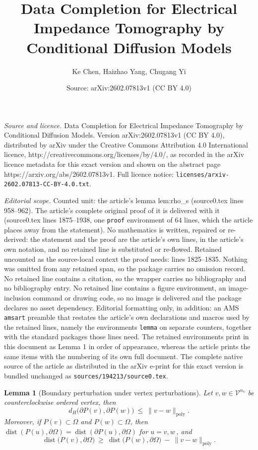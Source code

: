 \documentclass[10pt,a4paper]{amsart}
\title{Data Completion for Electrical Impedance Tomography by Conditional Diffusion Models}
\author{Ke Chen, Haizhao Yang, Chugang Yi}
\date{Source: arXiv:2602.07813v1 (CC BY 4.0)}
\newtheorem{lemma}{Lemma}
\newcommand{\dist}{\operatorname{dist}}
\begin{document}
\maketitle

\noindent\emph{Source and licence.} Data Completion for Electrical Impedance Tomography by Conditional Diffusion Models. Version arXiv:2602.07813v1 (CC BY 4.0), distributed by arXiv under the Creative Commons Attribution 4.0 International licence, http://creativecommons.org/licenses/by/4.0/, as recorded in the arXiv licence metadata for this exact version and shown on the abstract page https://arxiv.org/abs/2602.07813v1. Full licence notice: \texttt{licenses/arxiv-2602.07813-CC-BY-4.0.txt}.\par\smallskip

\noindent\textit{Editorial scope.} Counted unit: the article's lemma lem:rho\_s (source0.tex lines 958--962). The article's complete original proof of it is delivered with it (source0.tex lines 1875--1938, one \texttt{proof} environment of 64 lines, which the article places away from the statement). No mathematics is written, repaired or re-derived: the statement and the proof are the article's own lines, in the article's own notation, and no retained line is substituted or re-flowed.  Retained uncounted as the source-local context the proof needs: lines 1825--1835.  Nothing was omitted from any retained span, so the package carries no omission record.  No retained line contains a citation, so the wrapper carries no bibliography and no bibliography entry.  No retained line contains a figure environment, an image-inclusion command or drawing code, so no image is delivered and the package declares no asset dependency.  Editorial formatting only, in addition: an AMS \texttt{amsart} preamble that restates the article's own declarations and macros used by the retained lines, namely the environments \texttt{lemma} on separate counters, together with the standard packages those lines need.  The retained environments print in this document as Lemma 1 in order of appearance, whereas the article prints the same items with the numbering of its own full document.  The complete native source of the article as distributed in the arXiv e-print for this exact version is bundled unchanged as \texttt{sources/194213/source0.tex}.
\begin{lemma}[Boundary perturbation under vertex perturbations]\label{lem:dist-boundary-perturb}
Let $v,w\in \mathcal{V}^{n_{\mathrm v}}$ be counterclockwise ordered vertex, then
\[
d_H\big(\partial P(v),\partial P(w)\big)\ \le\ \|v-w\|_{\mathrm{poly}}.
\]
Moreover, if $P(v)\subset\Omega$ and $P(w)\subset\Omega$, then
$\dist(P(u),\partial\Omega)=\dist(\partial P(u),\partial\Omega)$ for $u=v,w$\,, and
\[
\dist\big(P(v),\partial\Omega\big)\ \ge\ \dist\big(P(w),\partial\Omega\big)\ -\ \|v-w\|_{\mathrm{poly}}.
\]
\end{lemma}
\end{document}

